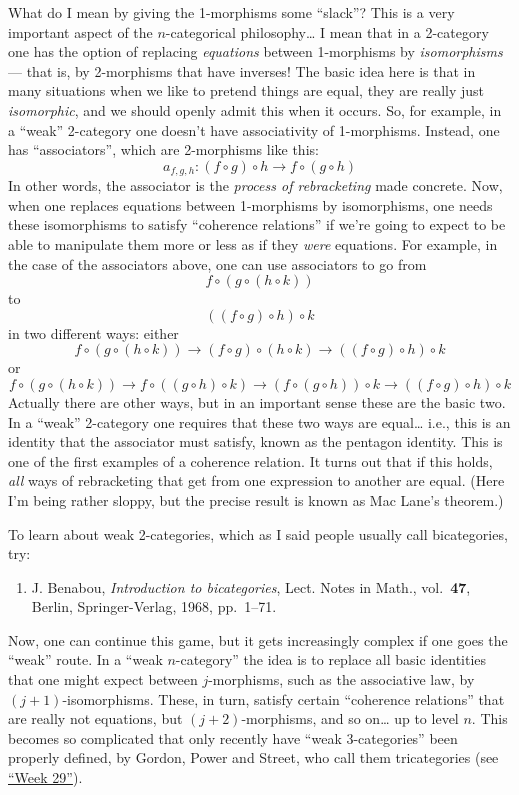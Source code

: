 \documentclass{article}
\def\tightlist{}
\begin{document}
What do I mean by giving the 1-morphisms some ``slack''? This is a very
important aspect of the \(n\)-categorical philosophy\ldots{} I mean that
in a 2-category one has the option of replacing \emph{equations} between
1-morphisms by \emph{isomorphisms} --- that is, by 2-morphisms that have
inverses! The basic idea here is that in many situations when we like to
pretend things are equal, they are really just \emph{isomorphic}, and we
should openly admit this when it occurs. So, for example, in a ``weak''
2-category one doesn't have associativity of 1-morphisms. Instead, one
has ``associators'', which are 2-morphisms like this:
\[a_{f,g,h}: (f \circ g) \circ h \to f \circ (g \circ h)\] In other
words, the associator is the \emph{process of rebracketing} made
concrete. Now, when one replaces equations between 1-morphisms by
isomorphisms, one needs these isomorphisms to satisfy ``coherence
relations'' if we're going to expect to be able to manipulate them more
or less as if they \emph{were} equations. For example, in the case of
the associators above, one can use associators to go from
\[f \circ (g \circ (h \circ k))\] to \[((f \circ g) \circ h) \circ k\]
in two different ways: either
\[f \circ (g \circ (h \circ k)) \to (f \circ g) \circ (h \circ k) \to ((f \circ g) \circ h) \circ k\]
or
\[f \circ (g \circ (h \circ k)) \to f \circ ((g \circ h) \circ k) \to (f \circ (g \circ h)) \circ k \to ((f \circ g) \circ h) \circ k\]
Actually there are other ways, but in an important sense these are the
basic two. In a ``weak'' 2-category one requires that these two ways are
equal\ldots{} i.e., this is an identity that the associator must
satisfy, known as the pentagon identity. This is one of the first
examples of a coherence relation. It turns out that if this holds,
\emph{all} ways of rebracketing that get from one expression to another
are equal. (Here I'm being rather sloppy, but the precise result is
known as Mac Lane's theorem.)

To learn about weak 2-categories, which as I said people usually call
bicategories, try:

\begin{enumerate}
\def\labelenumi{\arabic{enumi})}
\setcounter{enumi}{1}
\tightlist
\item
  J. Benabou, \emph{Introduction to bicategories}, Lect. Notes in Math.,
  vol.~\textbf{47}, Berlin, Springer-Verlag, 1968, pp.~1--71.
\end{enumerate}

Now, one can continue this game, but it gets increasingly complex if one
goes the ``weak'' route. In a ``weak \(n\)-category'' the idea is to
replace all basic identities that one might expect between
\(j\)-morphisms, such as the associative law, by \((j+1)\)-isomorphisms.
These, in turn, satisfy certain ``coherence relations'' that are really
not equations, but \((j+2)\)-morphisms, and so on\ldots{} up to level
\(n\). This becomes so complicated that only recently have ``weak
3-categories'' been properly defined, by Gordon, Power and Street, who
call them tricategories (see \protect\hyperlink{week29}{``Week 29''}).
\end{document}
